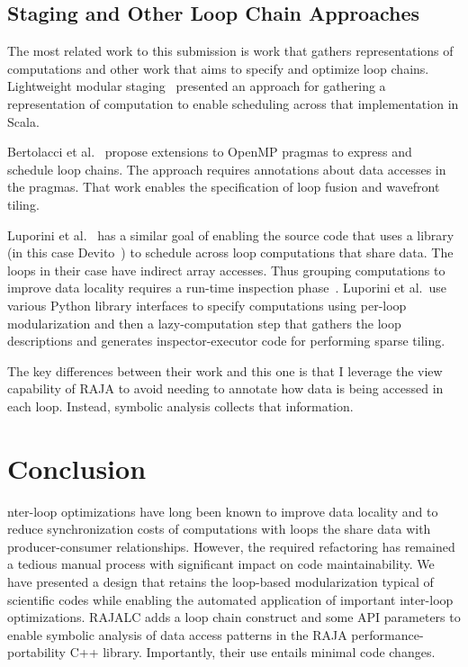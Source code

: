 \subsection{Staging and Other Loop Chain Approaches}

The most related work to this submission is work that gathers representations of computations and other work that aims to specify and optimize loop chains.
Lightweight modular staging~\cite{LMS2012} presented an approach for gathering 
a representation of computation to enable scheduling across that implementation
in Scala.

Bertolacci et al.~\cite{Bertolacci2016,bertolacci2019using} propose extensions to
OpenMP pragmas to express and schedule loop chains.
The approach requires annotations about data accesses in the pragmas.
That work enables the specification of loop fusion and wavefront tiling. 

Luporini et al.~\cite{Luporini2019} has a similar goal of enabling the source
code that uses a library  (in this case Devito~\cite{Luporini2018}) to
schedule across loop computations that share data.
The loops in their case have indirect array accesses.
Thus grouping computations to improve data locality requires a run-time
inspection phase~\cite{Strout14IPDPS}.
Luporini et al.\ use various Python library interfaces to specify computations
using per-loop modularization and then a lazy-computation step that gathers
the loop descriptions and generates inspector-executor code for performing 
sparse tiling.

The key differences between their work and this one is that I leverage the view 
capability of RAJA to avoid needing to annotate how data is being accessed
in each loop.  
Instead, symbolic analysis collects that information.

\section{Conclusion}
nter-loop optimizations have long been known to improve data locality and 
to reduce synchronization costs of computations with loops the share data
with producer-consumer relationships.
However, the required refactoring has remained a tedious manual process with 
significant impact on code maintainability.
We have presented a design that retains the loop-based modularization typical
of scientific codes while enabling the automated application of important
inter-loop optimizations.
RAJALC adds a loop chain construct and some API parameters to enable symbolic
analysis of data access patterns in the RAJA performance-portability C++
library. 
Importantly, their use entails minimal code changes. 


